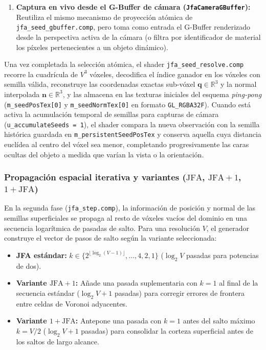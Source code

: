 \begin{enumerate}
  \item \textbf{Captura en vivo desde el G-Buffer de cámara (\texttt{JfaCameraGBuffer}):} Reutiliza el mismo mecanismo de proyección atómica de \texttt{jfa\_seed\_gbuffer.comp}, pero toma como entrada el G-Buffer renderizado desde la perspectiva activa de la cámara (o filtra por identificador de material los píxeles pertenecientes a un objeto dinámico).
\end{enumerate}

Una vez completada la selección atómica, el shader \texttt{jfa\_seed\_resolve.comp} recorre la cuadrícula de $V^3$ vóxeles, decodifica el índice ganador en los vóxeles con semilla válida, reconstruye las coordenadas exactas sub-vóxel $\mathbf{q} \in \mathbb{R}^3$ y la normal interpolada $\mathbf{n} \in \mathbb{R}^3$, y las almacena en las texturas iniciales del esquema \textit{ping-pong} (\texttt{m\_seedPosTex[0]} y \texttt{m\_seedNormTex[0]} en formato \texttt{GL\_RGBA32F}). Cuando está activa la acumulación temporal de semillas para capturas de cámara (\texttt{u\_accumulateSeeds = 1}), el shader compara la nueva observación con la semilla histórica guardada en \texttt{m\_persistentSeedPosTex} y conserva aquella cuya distancia euclídea al centro del vóxel sea menor, completando progresivamente las caras ocultas del objeto a medida que varían la vista o la orientación.

\subsubsection{Propagación espacial iterativa y variantes (\texorpdfstring{$\text{JFA}$, $\text{JFA}+1$, $1+\text{JFA}$}{JFA, JFA+1, 1+JFA})}

En la segunda fase (\texttt{jfa\_step.comp}), la información de posición y normal de las semillas superficiales se propaga al resto de vóxeles vacíos del dominio en una secuencia logarítmica de pasadas de salto. Para una resolución $V$, el generador construye el vector de pasos de salto según la variante seleccionada:

\begin{itemize}
  \item \textbf{JFA estándar:} $k \in \{ 2^{\lfloor \log_2(V-1) \rfloor}, \dots, 4, 2, 1 \}$ ($\log_2 V$ pasadas para potencias de dos).
  \item \textbf{Variante $\text{JFA}+1$:} Añade una pasada suplementaria con $k = 1$ al final de la secuencia estándar ($\log_2 V + 1$ pasadas) para corregir errores de frontera entre celdas de Voronoi adyacentes.
  \item \textbf{Variante $1+\text{JFA}$:} Antepone una pasada con $k = 1$ antes del salto máximo $k = V/2$ ($\log_2 V + 1$ pasadas) para consolidar la corteza superficial antes de los saltos de largo alcance.
\end{itemize}

